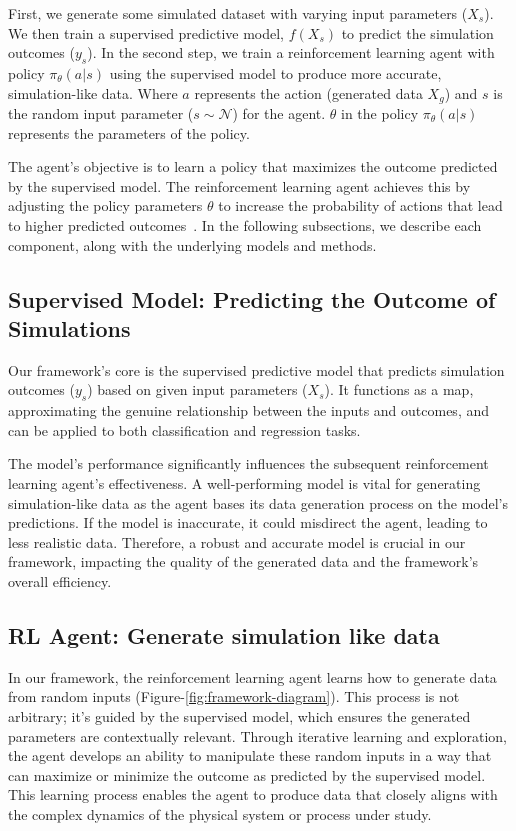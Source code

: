 \documentclass{article}
\begin{document}
First, we generate some simulated dataset with varying input parameters ($X_s$). We then train a supervised predictive model, $f(X_s)$ to predict the simulation outcomes ($y_s$). In the second step, we train a reinforcement learning agent with policy $\pi_{\theta}(a|s)$ using the supervised model to produce more accurate, simulation-like data. Where $a$ represents the action (generated data $X_g$) and $s$ is the random input parameter ($s\sim \mathcal{N}$) for the agent. $\theta$ in the policy $\pi_{\theta}(a|s)$ represents the parameters of the policy.

The agent's objective is to learn a policy that maximizes the outcome predicted by the supervised model. The reinforcement learning agent achieves this by adjusting the policy parameters $\theta$ to increase the probability of actions that lead to higher predicted outcomes~\cite{sutton2018reinforcement}. In the following subsections, we describe each component, along with the underlying models and methods.

\subsection{Supervised Model: Predicting the Outcome of Simulations}

Our framework's core is the supervised predictive model that predicts simulation outcomes ($y_s$) based on given input parameters ($X_s$). It functions as a map, approximating the genuine relationship between the inputs and outcomes, and can be applied to both classification and regression tasks.

The model's performance significantly influences the subsequent reinforcement learning agent's effectiveness. A well-performing model is vital for generating simulation-like data as the agent bases its data generation process on the model's predictions. If the model is inaccurate, it could misdirect the agent, leading to less realistic data. Therefore, a robust and accurate model is crucial in our framework, impacting the quality of the generated data and the framework's overall efficiency.

\subsection{RL Agent: Generate simulation like data}

In our framework, the reinforcement learning agent learns how to generate data from random inputs (Figure-\ref{fig:framework-diagram}). This process is not arbitrary; it's guided by the supervised model, which ensures the generated parameters are contextually relevant. Through iterative learning and exploration, the agent develops an ability to manipulate these random inputs in a way that can maximize or minimize the outcome as predicted by the supervised model. This learning process enables the agent to produce data that closely aligns with the complex dynamics of the physical system or process under study.
\end{document}
